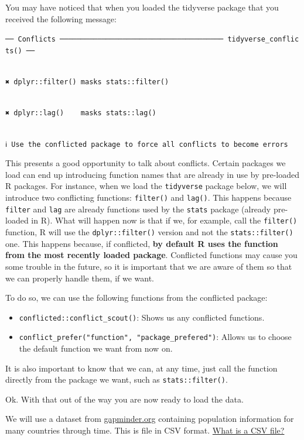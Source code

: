 \documentclass[
]{book}
\providecommand{\tightlist}{%
  \setlength{\itemsep}{0pt}\setlength{\parskip}{0pt}}
\begin{document}
You may have noticed that when you loaded the tidyverse package that you received the following message:

\texttt{──\ Conflicts\ ───────────────────────────────────────\ tidyverse\_conflicts()\ ──}\strut \\
\texttt{✖\ dplyr::filter()\ masks\ stats::filter()}\strut \\
\texttt{✖\ dplyr::lag()\ \ \ \ masks\ stats::lag()}\strut \\
\texttt{ℹ\ Use\ the\ conflicted\ package\ to\ force\ all\ conflicts\ to\ become\ errors}

This presents a good opportunity to talk about conflicts. Certain packages we load can end up introducing function names that are already in use by pre-loaded R packages. For instance, when we load the \texttt{tidyverse} package below, we will introduce two conflicting functions: \texttt{filter()} and \texttt{lag()}. This happens because \texttt{filter} and \texttt{lag} are already functions used by the \texttt{stats} package (already pre-loaded in R). What will happen now is that if we, for example, call the \texttt{filter()} function, R will use the \texttt{dplyr::filter()} version and not the \texttt{stats::filter()} one. This happens because, if conflicted, \textbf{by default R uses the function from the most recently loaded package}. Conflicted functions may cause you some trouble in the future, so it is important that we are aware of them so that we can properly handle them, if we want.

To do so, we can use the following functions from the conflicted package:

\begin{itemize}
\tightlist
\item
  \texttt{conflicted::conflict\_scout()}: Shows us any conflicted functions.
\item
  \texttt{conflict\_prefer("function",\ "package\_prefered")}: Allows us to choose the default function we want from now on.
\end{itemize}

It is also important to know that we can, at any time, just call the function directly from the package we want, such as \texttt{stats::filter()}.

Ok. With that out of the way you are now ready to load the data.

We will use a dataset from \url{gapminder.org} containing population information for many countries through time. This is file in CSV format. \href{https://en.wikipedia.org/wiki/Comma-separated_values}{What is a CSV file?}
\end{document}
